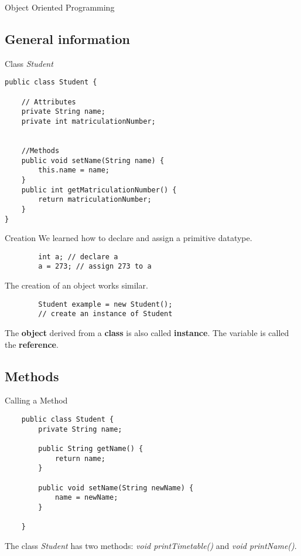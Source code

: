 \begin{frame}{}
	\begin{center}
		{\huge Object Oriented Programming}
	\end{center}
\end{frame}

\subsection{General information}

\begin{frame}[fragile]{Class \emph{Student}}
\begin{lstlisting}
public class Student {

	// Attributes
	private String name; 
	private int matriculationNumber; 
	
	
	//Methods
	public void setName(String name) {
		this.name = name;
	}
	public int getMatriculationNumber() {
		return matriculationNumber;
	}
}
\end{lstlisting}



\end{frame}

\begin{frame}[fragile]{Creation}
	We learned how to declare and assign a primitive datatype.
	
	\begin{lstlisting}
	    int a; // declare a
	    a = 273; // assign 273 to a
	\end{lstlisting} 
	
	The creation of an object works similar.
	
	\begin{lstlisting}
	    Student example = new Student(); 
		// create an instance of Student
	\end{lstlisting}
	The \textbf{object} derived from a \textbf{class} is also called \textbf{instance}.
	The variable is called the \textbf{reference}.
\end{frame}

\subsection{Methods}
\begin{frame}[fragile]{Calling a Method}
	\begin{lstlisting}
	public class Student {
		private String name;
	
		public String getName() {
        	return name;
    	}
		
	    public void setName(String newName) {
			name = newName;
	    }
	   
	}
	\end{lstlisting}
	The class \emph{Student} has two methods: \emph{void printTimetable()} and \emph{void printName()}.
\end{frame}

